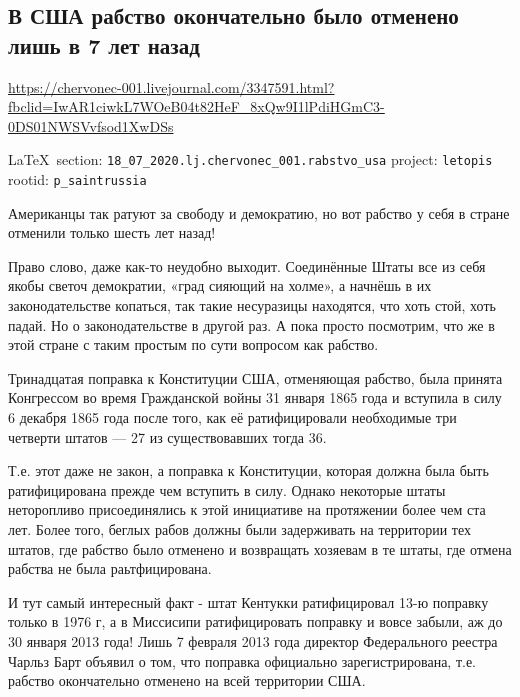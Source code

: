  
 
\subsection{В США рабство окончательно было отменено лишь в 7 лет назад}
\label{sec:18_07_2020.lj.chervonec_001.rabstvo_usa}
\url{https://chervonec-001.livejournal.com/3347591.html?fbclid=IwAR1ciwkL7WOeB04t82HeF_8xQw9I1lPdiHGmC3-0DS01NWSVvfsod1XwDSs}
  
\vspace{0.5cm}
{\small\LaTeX~section: \verb|18_07_2020.lj.chervonec_001.rabstvo_usa| project: \verb|letopis| rootid: \verb|p_saintrussia|}
\vspace{0.5cm}

Американцы так ратуют за свободу и демократию, но вот рабство у себя в стране
отменили только шесть лет назад!

Право слово, даже как-то неудобно выходит. Соединённые Штаты все из себя якобы
светоч демократии, «град сияющий на холме», а начнёшь в их законодательстве
копаться, так такие несуразицы находятся, что хоть стой, хоть падай. Но о
законодательстве в другой раз. А пока просто посмотрим, что же в этой стране с
таким простым по сути вопросом как рабство.

Тринадцатая поправка к Конституции США, отменяющая рабство, была принята
Конгрессом во время Гражданской войны 31 января 1865 года и вступила в силу 6
декабря 1865 года после того, как её ратифицировали необходимые три четверти
штатов --- 27 из существовавших тогда 36.

Т.е. этот даже не закон, а поправка к Конституции, которая должна была быть
ратифицирована прежде чем вступить в силу. Однако некоторые штаты неторопливо
присоединялись к этой инициативе на протяжении более чем ста лет. Более того,
беглых рабов должны были задерживать на территории тех штатов, где рабство было
отменено и возвращать хозяевам в те штаты, где отмена рабства не была
раьтфицирована.

И тут самый интересный факт - штат Кентукки ратифицировал 13-ю поправку только
в 1976 г, а в Миссисипи ратифицировать поправку и вовсе забыли, аж до 30 января
2013 года! Лишь 7 февраля 2013 года директор Федерального реестра Чарльз Барт
объявил о том, что поправка официально зарегистрирована, т.е. рабство
окончательно отменено на всей территории США.

